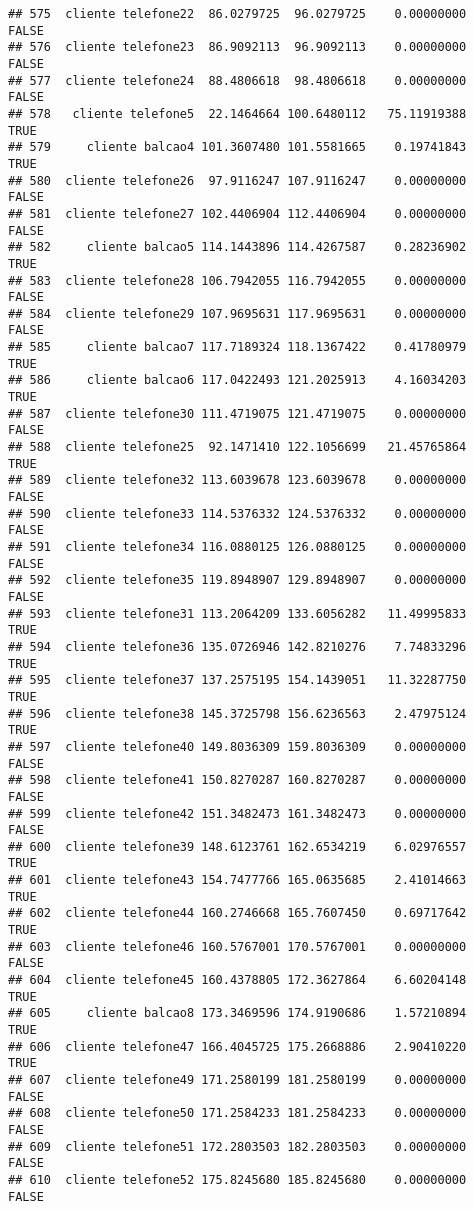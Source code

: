 \documentclass[
]{article}
\begin{document}
\begin{verbatim}
## 575  cliente telefone22  86.0279725  96.0279725    0.00000000    FALSE
## 576  cliente telefone23  86.9092113  96.9092113    0.00000000    FALSE
## 577  cliente telefone24  88.4806618  98.4806618    0.00000000    FALSE
## 578   cliente telefone5  22.1464664 100.6480112   75.11919388     TRUE
## 579     cliente balcao4 101.3607480 101.5581665    0.19741843     TRUE
## 580  cliente telefone26  97.9116247 107.9116247    0.00000000    FALSE
## 581  cliente telefone27 102.4406904 112.4406904    0.00000000    FALSE
## 582     cliente balcao5 114.1443896 114.4267587    0.28236902     TRUE
## 583  cliente telefone28 106.7942055 116.7942055    0.00000000    FALSE
## 584  cliente telefone29 107.9695631 117.9695631    0.00000000    FALSE
## 585     cliente balcao7 117.7189324 118.1367422    0.41780979     TRUE
## 586     cliente balcao6 117.0422493 121.2025913    4.16034203     TRUE
## 587  cliente telefone30 111.4719075 121.4719075    0.00000000    FALSE
## 588  cliente telefone25  92.1471410 122.1056699   21.45765864     TRUE
## 589  cliente telefone32 113.6039678 123.6039678    0.00000000    FALSE
## 590  cliente telefone33 114.5376332 124.5376332    0.00000000    FALSE
## 591  cliente telefone34 116.0880125 126.0880125    0.00000000    FALSE
## 592  cliente telefone35 119.8948907 129.8948907    0.00000000    FALSE
## 593  cliente telefone31 113.2064209 133.6056282   11.49995833     TRUE
## 594  cliente telefone36 135.0726946 142.8210276    7.74833296     TRUE
## 595  cliente telefone37 137.2575195 154.1439051   11.32287750     TRUE
## 596  cliente telefone38 145.3725798 156.6236563    2.47975124     TRUE
## 597  cliente telefone40 149.8036309 159.8036309    0.00000000    FALSE
## 598  cliente telefone41 150.8270287 160.8270287    0.00000000    FALSE
## 599  cliente telefone42 151.3482473 161.3482473    0.00000000    FALSE
## 600  cliente telefone39 148.6123761 162.6534219    6.02976557     TRUE
## 601  cliente telefone43 154.7477766 165.0635685    2.41014663     TRUE
## 602  cliente telefone44 160.2746668 165.7607450    0.69717642     TRUE
## 603  cliente telefone46 160.5767001 170.5767001    0.00000000    FALSE
## 604  cliente telefone45 160.4378805 172.3627864    6.60204148     TRUE
## 605     cliente balcao8 173.3469596 174.9190686    1.57210894     TRUE
## 606  cliente telefone47 166.4045725 175.2668886    2.90410220     TRUE
## 607  cliente telefone49 171.2580199 181.2580199    0.00000000    FALSE
## 608  cliente telefone50 171.2584233 181.2584233    0.00000000    FALSE
## 609  cliente telefone51 172.2803503 182.2803503    0.00000000    FALSE
## 610  cliente telefone52 175.8245680 185.8245680    0.00000000    FALSE

\end{verbatim}
\end{document}
